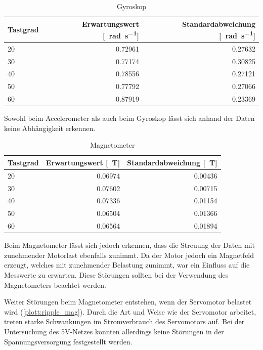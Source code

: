 \begin{table}[H]
  \centering
  \begin{tabularx}{\textwidth}{|X|r|r|}
    \hline
     Tastgrad & Erwartungswert [\SI{}{\radian\per\second}] & Standardabweichung [\SI{}{\radian\per\second}]  \\ \hline \hline
     20 & 0.72961 & 0.27632\\ \hline
     30 & 0.77174 & 0.30825\\ \hline
     40 & 0.78556 & 0.27121\\ \hline
     50 & 0.77792 & 0.27066\\ \hline
     60 & 0.87919 & 0.23369\\ \hline
  \end{tabularx}
  \caption{Gyroskop}%
  \label{tab:gyro}
\end{table}


Sowohl beim Accelerometer als auch beim Gyroskop lässt sich anhand der Daten keine Abhängigkeit erkennen.

\begin{table}[H]
  \centering
  \begin{tabularx}{\textwidth}{|X|r|r|}
    \hline
     Tastgrad & Erwartungswert [\SI{}{\tesla}] & Standardabweichung [\SI{}{\tesla}]  \\ \hline \hline
     20 & 0.06974 & 0.00436\\ \hline
     30 & 0.07602 & 0.00715\\ \hline
     40 & 0.07336 & 0.01154\\ \hline
     50 & 0.06504 & 0.01366\\ \hline
     60 & 0.06564 & 0.01894\\ \hline
  \end{tabularx}
  \caption{Magnetometer}%
  \label{tab:mag}
\end{table}

Beim Magnetometer lässt sich jedoch erkennen, dass die Streuung der Daten mit zunehmender Motorlast ebenfalls zunimmt. Da der Motor jedoch ein Magnetfeld
erzeugt, welches mit zunehmender Belastung zunimmt, war ein Einfluss auf die Messwerte zu erwarten. Diese Störungen sollten bei der Verwendung
des Magnetometers beachtet werden.


Weiter Störungen beim Magnetometer entstehen, wenn der Servomotor belastet wird (\cref{plott:ripple_mag}). Durch die Art und Weise wie der Servomotor arbeitet, treten starke Schwankungen im Stromverbrauch des Servomotors auf.
Bei der Untersuchung des 5V-Netzes konnten allerdings keine Störungen in der Spannungsversorgung festgestellt werden.


